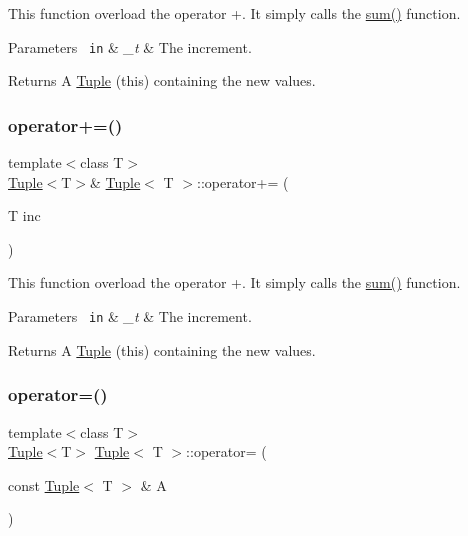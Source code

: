 This function overload the operator +. It simply calls the {\ttfamily \mbox{\hyperlink{class_tuple_a2b595ce33576c6fcb36d74b46f0a7c55}{sum()}}} function. 
\begin{DoxyParams}[1]{Parameters}
\mbox{\texttt{ in}}  & {\em \+\_\+t} & The increment. \\
\hline
\end{DoxyParams}
\begin{DoxyReturn}{Returns}
A {\ttfamily \mbox{\hyperlink{class_tuple}{Tuple}}} (this) containing the new values. 
\end{DoxyReturn}
\mbox{\label{class_tuple_aeace0f594f48529ddf3385cb2f023daf}} 
\subsubsection{\texorpdfstring{operator+=()}{operator+=()}}
{\footnotesize\ttfamily template$<$class T$>$ \\
\mbox{\hyperlink{class_tuple}{Tuple}}$<$T$>$\& \mbox{\hyperlink{class_tuple}{Tuple}}$<$ T $>$\+::operator+= (\begin{DoxyParamCaption}\item[{T}]{inc }\end{DoxyParamCaption})\hspace{0.3cm}{\ttfamily [inline]}}

This function overload the operator +. It simply calls the {\ttfamily \mbox{\hyperlink{class_tuple_a2b595ce33576c6fcb36d74b46f0a7c55}{sum()}}} function. 
\begin{DoxyParams}[1]{Parameters}
\mbox{\texttt{ in}}  & {\em \+\_\+t} & The increment. \\
\hline
\end{DoxyParams}
\begin{DoxyReturn}{Returns}
A {\ttfamily \mbox{\hyperlink{class_tuple}{Tuple}}} (this) containing the new values. 
\end{DoxyReturn}
\mbox{\label{class_tuple_ab47559b59159610317779405337c2b44}} 
\subsubsection{\texorpdfstring{operator=()}{operator=()}}
{\footnotesize\ttfamily template$<$class T$>$ \\
\mbox{\hyperlink{class_tuple}{Tuple}}$<$T$>$ \mbox{\hyperlink{class_tuple}{Tuple}}$<$ T $>$\+::operator= (\begin{DoxyParamCaption}\item[{const \mbox{\hyperlink{class_tuple}{Tuple}}$<$ T $>$ \&}]{A }\end{DoxyParamCaption})\hspace{0.3cm}{\ttfamily [inline]}}



